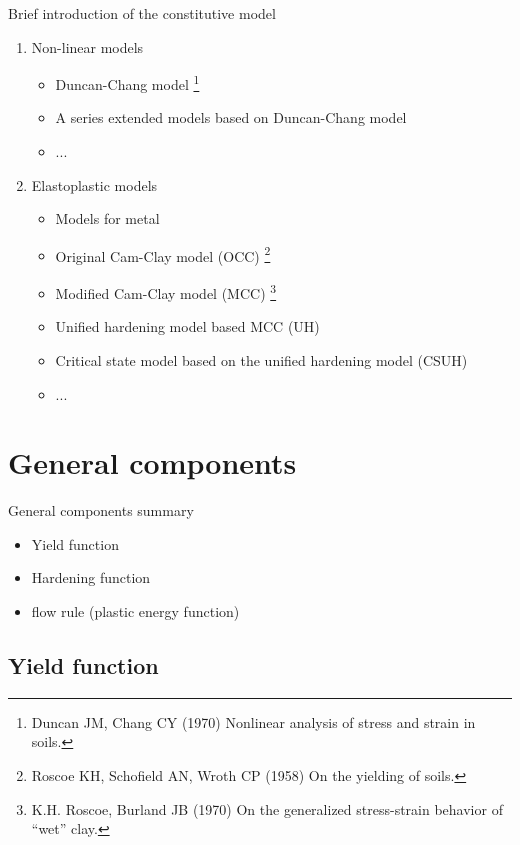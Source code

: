 \documentclass[aspectratio=169]{beamer}
\begin{document}
\begin{frame}{Brief introduction of the constitutive model}
    \begin{enumerate}%
        \item Non-linear models
        \begin{itemize}
        	\item Duncan-Chang model \cite{Duncan1970}\footnote{Duncan JM, Chang CY (1970) Nonlinear analysis of stress and strain in soils.}
        	\item A series extended models based on Duncan-Chang model
        	\item ...
        \end{itemize}
        \item Elastoplastic models
        \begin{itemize}
        	\item Models for metal 
        	\item Original Cam-Clay model (OCC)  \cite{CriticalStateCambidgeModelRoscoe1958}\footnote{Roscoe KH, Schofield AN, Wroth CP (1958) On the yielding of soils.}
        	\item Modified Cam-Clay model (MCC)  \cite{Burland1970} \footnote{K.H. Roscoe, Burland JB (1970) On the generalized stress-strain behavior of “wet” clay.}
        	\item Unified hardening model based MCC (UH)
        	\item Critical state model based on the unified hardening model (CSUH)
        	\item ...
        \end{itemize}
    \end{enumerate}
\end{frame}

\section{General components}
\begin{frame}{General components summary}
    \begin{itemize}
        \item Yield function
        \item Hardening function
        \item flow rule (plastic energy function)
    \end{itemize}
\end{frame}


\subsection{Yield function}
\end{document}

